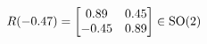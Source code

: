 \documentclass[preview]{standalone}
\begin{document}
\begin{align*}
\special{dvisvgm:raw <g id='unique000'>}R(-0.47) = \begin{bmatrix} 0.89 & 0.45 \\ -0.45 & 0.89 \end{bmatrix} \in \text{SO}(2)\special{dvisvgm:raw </g>}
\end{align*}
\end{document}
